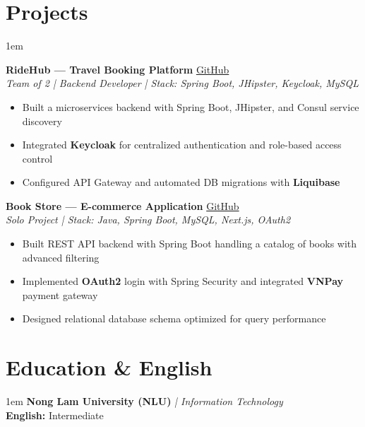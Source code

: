 \documentclass[11pt,a4paper]{article}
\begin{document}
\section{Projects}
\begin{adjustwidth}{1em}{}
	\small

	\textbf{RideHub --- Travel Booking Platform} \quad
	\href{https://github.com/LeTrungMiniuh/ridehub}{GitHub} \\
	\textit{Team of 2 | Backend Developer | Stack: Spring Boot, JHipster, Keycloak, MySQL}
	\begin{itemize}
		\item Built a microservices backend with Spring Boot, JHipster, and Consul service discovery
		\item Integrated \textbf{Keycloak} for centralized authentication and role-based access control
		\item Configured API Gateway and automated DB migrations with \textbf{Liquibase}
	\end{itemize}

	\vspace{0.3em}

	\textbf{Book Store --- E-commerce Application} \quad
	\href{https://github.com/phungle2508/book-store-app}{GitHub} \\
	\textit{Solo Project | Stack: Java, Spring Boot, MySQL, Next.js, OAuth2}
	\begin{itemize}
		\item Built REST API backend with Spring Boot handling a catalog of books with advanced filtering
		\item Implemented \textbf{OAuth2} login with Spring Security and integrated \textbf{VNPay} payment gateway
		\item Designed relational database schema optimized for query performance
	\end{itemize}

\end{adjustwidth}

\section{Education \& English}
\begin{adjustwidth}{1em}{}
	\small
	\textbf{Nong Lam University (NLU)} \textit{| Information Technology} \\[0.15em]
	\textbf{English:} Intermediate
\end{adjustwidth}
\end{document}
